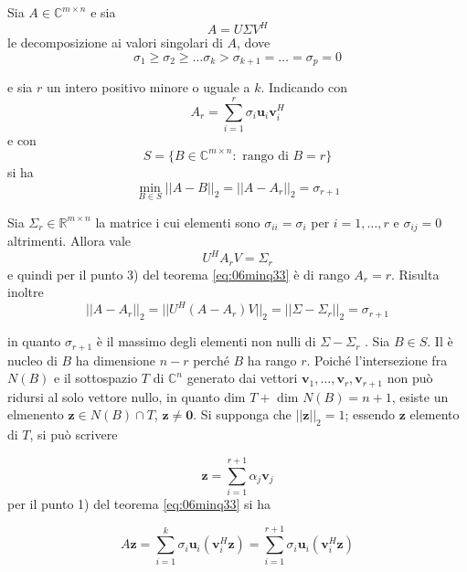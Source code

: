 \begin{theo} Sia $A \in \mathbb{C}^{m \times n}$ e sia
$$ A = U \Sigma V^{H}$$
le decomposizione ai valori singolari di $A$, dove
$$ \sigma_1 \geq \sigma_2 \geq \ldots \sigma_k >
\sigma_{k+1} = \ldots = \sigma_p = 0
$$

e sia $r$ un intero positivo minore o uguale a $k$. Indicando con
$$ A_{r} = \displaystyle \sum_{i=1}^{r} \sigma_i 
\mathbf{u}_{i} \mathbf{v}_{i}^{H} 
$$
e con
$$ S = \{ B \in \mathbb{C}^{m \times n} : \text{ rango di } B = r \}$$
si ha
$$
\min_{B \in S} || A - B||_{2} = ||A - A_{r} ||_{2} = \sigma_{r+1}
 $$
\end{theo}
\begin{thproof}
 Sia $\Sigma_{r} \in \mathbb{R}^{m \times n}$ la matrice i cui
elementi sono $\sigma_{ii} = \sigma_i$ per $i=1, \ldots, r$
e $\sigma_{ij} = 0$ altrimenti. Allora vale
$$ U^{H} A_{r} V = \Sigma_{r} $$
e quindi per il punto 3) del teorema
\ref{eq:06minq33}
\`e di rango $A_{r} = r$. Risulta inoltre
\begin{equation}
\label{eq:06minq49}
 ||A - A_{r}||_{2} = ||U^{H}(A - A_r)V||_{2} = 
|| \Sigma - \Sigma_r||_{2} = \sigma_{r+1}
\end{equation}

in quanto $\sigma_{r+1}$ \`e il massimo degli elementi non nulli di
 $\Sigma −\Sigma_{r}$ . Sia $B \in S$. Il
\`e nucleo di $B$ ha dimensione $n- r$ perch\'e $B$ ha rango $r$. 
Poich\'e l'intersezione
fra $N(B)$ e il sottospazio $T$ di $\mathbb{C}^n$ generato dai vettori $\mathbf{v}_1 , \ldots , \mathbf{v}_{r} , 
\mathbf{v}_{r+1}$ non
pu\`o ridursi al solo vettore nullo, in quanto dim 
 $T  + $ dim $N(B) = n + 1$, esiste un elmenento
$\mathbf{z} \in N(B) \cap T$, $\mathbf{z} \neq \mathbf{0}$.
Si supponga che $||\mathbf{z}||_2 = 1$; essendo
$\mathbf{z}$ elemento di $T$, si pu\`o scrivere

\begin{equation}
\label{eq:06minq50}
\mathbf{z} = \displaystyle \sum_{i=1}^{r+1} \alpha_j
\mathbf{v}_{j}
\end{equation}
per il punto 1) del teorema
\ref{eq:06minq33} si ha

\begin{equation}
\label{eq:06minq51}
A\mathbf{z} = 
\displaystyle \sum_{i=1}^{k}
\sigma_i \mathbf{u}_{i}(\mathbf{v}^{H}_i \mathbf{z})
= \displaystyle \sum_{i=1}^{r+1} \sigma_i \mathbf{u}_{i}
(\mathbf{v}_{i}^{H}\mathbf{z})
\end{equation}


\end{thproof}
